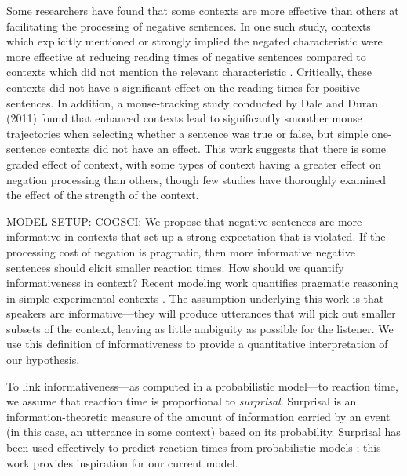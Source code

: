 \documentclass[man]{apa2}
\begin{document}
Some researchers have found that some contexts are more effective than others at facilitating the processing of negative sentences.  In one such study, contexts which explicitly mentioned or strongly implied the negated characteristic were more effective at reducing reading times of negative sentences compared to contexts which did not mention the relevant characteristic \cite{ludtke2006}.  Critically, these contexts did not have a significant effect on the reading times for positive sentences.  In addition, a mouse-tracking study conducted by Dale and Duran (2011) \nocite{dale2011} found that enhanced contexts lead to significantly smoother mouse trajectories when selecting whether a sentence was true or false, but simple one-sentence contexts did not have an effect.  This work suggests that there is some graded effect of context, with some types of context having a greater effect on negation processing than others, though few studies have thoroughly examined the effect of the strength of the context.











MODEL SETUP: 
COGSCI:
We propose that negative sentences are more informative in contexts that set up a strong expectation that is violated. If the processing cost of negation is pragmatic, then more informative negative sentences should elicit smaller reaction times. How should we quantify informativeness in context? Recent modeling work quantifies pragmatic reasoning in simple experimental contexts \cite{frank2012,goodman2013}. The assumption underlying this work is that speakers are informative---they will produce utterances that will pick out smaller subsets of the context, leaving as little ambiguity as possible for the listener.  We use this definition of informativeness to provide a quantitative interpretation of our hypothesis.

To link informativeness---as computed in a probabilistic model---to reaction time, we assume that reaction time is proportional to \emph{surprisal}. Surprisal is an information-theoretic measure of the amount of information carried by an event (in this case, an utterance in some context) based on its probability. Surprisal has been used effectively to predict reaction times from probabilistic models \cite{levy2008}; this work provides inspiration for our current model. 
\end{document}
